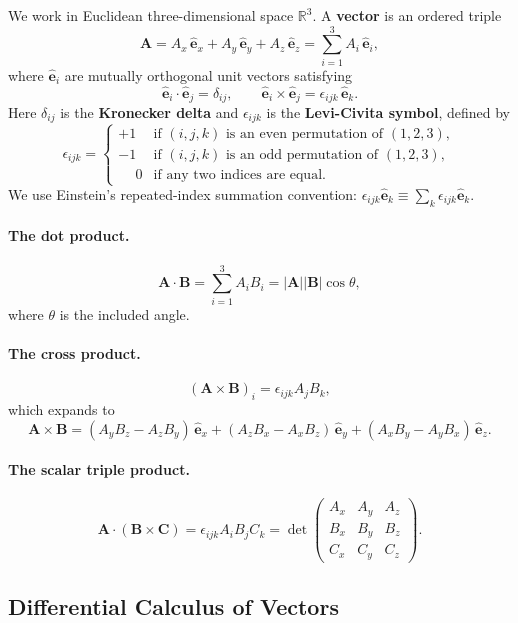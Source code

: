 \documentclass[12pt,a4paper]{article}
\theoremstyle{plain}
\theoremstyle{definition}
\theoremstyle{remark}
\newcommand{\R}{\mathbb{R}}
\newcommand{\ve}[1]{\mathbf{#1}}           %
\newcommand{\he}[1]{\hat{\mathbf{#1}}}     %
\begin{document}
We work in Euclidean three-dimensional space $\R^3$. A \textbf{vector} is an ordered triple
\[
  \ve{A}
  = A_x\,\he{e}_x + A_y\,\he{e}_y + A_z\,\he{e}_z
  = \sum_{i=1}^{3} A_i\,\he{e}_i,
\]
where $\he{e}_i$ are mutually orthogonal unit vectors satisfying
\[
  \he{e}_i \cdot \he{e}_j = \delta_{ij},
  \qquad
  \he{e}_i \times \he{e}_j = \epsilon_{ijk}\,\he{e}_k.
\]
Here $\delta_{ij}$ is the \textbf{Kronecker delta} and $\epsilon_{ijk}$ is the \textbf{Levi-Civita symbol}, defined by
\[
  \epsilon_{ijk} =
  \begin{cases}
    +1 & \text{if } (i,j,k) \text{ is an even permutation of } (1,2,3),\\
    -1 & \text{if } (i,j,k) \text{ is an odd permutation of } (1,2,3),\\
    \phantom{+}0 & \text{if any two indices are equal.}
  \end{cases}
\]
We use Einstein's repeated-index summation convention: $\epsilon_{ijk}\he{e}_k \equiv \sum_k \epsilon_{ijk}\he{e}_k$.

\paragraph{The dot product.}
\[
  \ve{A} \cdot \ve{B}
  = \sum_{i=1}^{3} A_i B_i
  = |\ve{A}||\ve{B}|\cos\theta,
\]
where $\theta$ is the included angle.

\paragraph{The cross product.}
\[
  (\ve{A} \times \ve{B})_i = \epsilon_{ijk} A_j B_k,
\]
which expands to
\[
  \ve{A} \times \ve{B}
  = (A_y B_z - A_z B_y)\,\he{e}_x
  + (A_z B_x - A_x B_z)\,\he{e}_y
  + (A_x B_y - A_y B_x)\,\he{e}_z.
\]

\paragraph{The scalar triple product.}
\[
  \ve{A} \cdot (\ve{B} \times \ve{C})
  = \epsilon_{ijk} A_i B_j C_k
  = \det\begin{pmatrix} A_x & A_y & A_z \\ B_x & B_y & B_z \\ C_x & C_y & C_z \end{pmatrix}.
\]

\subsection{Differential Calculus of Vectors}
\end{document}
